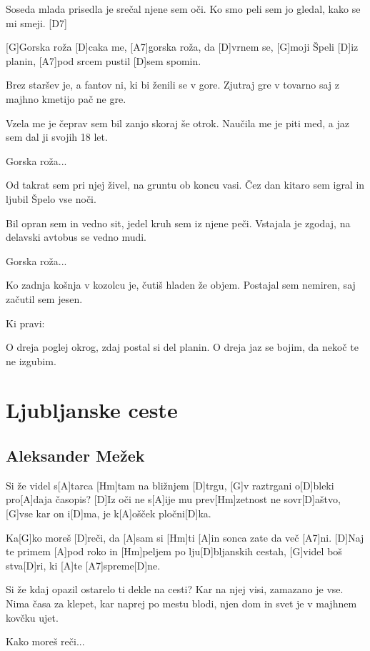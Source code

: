\documentclass[a4paper,12pt]{article}
\begin{document}
\begin{multicols}{2}
\begin{guitar}
Soseda mlada prisedla je
srečal njene sem oči.
Ko smo peli sem jo gledal,
kako se mi smeji. [D7]

  
[G]Gorska roža [D]caka me,
[A7]gorska roža, da [D]vrnem se,
[G]moji Špeli [D]iz planin,
[A7]pod srcem pustil [D]sem spomin.


Brez staršev je, a fantov ni,
ki bi ženili se v gore.
Zjutraj gre v tovarno
saj z majhno kmetijo pač ne gre.


Vzela me je čeprav sem bil
zanjo skoraj še otrok.
Naučila me je piti med,
a jaz sem dal ji svojih 18 let.


Gorska roža...


Od takrat sem pri njej živel,          
na gruntu ob koncu vasi.
Čez dan kitaro sem igral 
in ljubil Špelo vse noči.


Bil opran sem in vedno sit,
jedel kruh sem iz njene peči.
Vstajala je zgodaj, na delavski
avtobus se vedno mudi.


Gorska roža...


Ko zadnja košnja v kozolcu je,
čutiš hladen že objem.
Postajal sem nemiren, 
saj začutil sem jesen. 


Ki pravi:


O dreja poglej okrog,
zdaj postal si del planin.
O dreja jaz se bojim, 
da nekoč te ne izgubim.

\end{guitar}
\section{Ljubljanske ceste}
\subsection*{Aleksander Mežek}
\begin{guitar}
[D]Si že videl s[A]tarca 
[Hm]tam na bližnjem [D]trgu,
[G]v raztrgani o[D]bleki 
pro[A]daja časopis? 
[D]Iz oči ne s[A]ije mu prev[Hm]zetnost 
ne sovr[D]aštvo,
[G]vse kar on i[D]ma,
je k[A]ošček pločni[D]ka. 


Ka[G]ko moreš [D]reči, da [A]sam si [Hm]ti
[A]in sonca zate da več [A7]ni.
[D]Naj te primem [A]pod roko     
in [Hm]peljem po lju[D]bljanskih cestah,
[G]videl boš stva[D]ri, ki [A]te [A7]spreme[D]ne. 


Si že kdaj opazil 
ostarelo ti dekle na cesti? 
Kar na njej visi, 
zamazano je vse. 
Nima časa za klepet, 
kar naprej po mestu blodi, 
njen dom in svet 
je v majhnem kovčku ujet. 


Kako moreš reči... 



\end{guitar}
\end{multicols}
\end{document}
